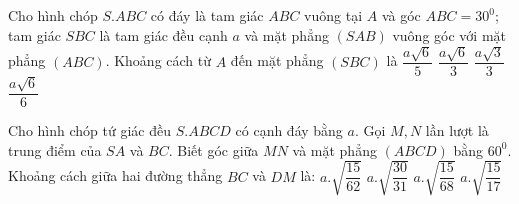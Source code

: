 \begin{ex}%
	Cho hình chóp $S. ABC$ có đáy là tam giác $ABC$ vuông tại $A$ và góc $\widehat{ABC}=30 ^0$; tam giác $SBC$ là tam giác đều cạnh $a$ và mặt phẳng $(SAB)$ vuông góc với mặt phẳng $\left (ABC\right)$. Khoảng cách từ $A$ đến mặt phẳng $\left (SBC\right)$ là
	\choice
	{$\dfrac{a\sqrt{6}}{5}$}
	{$\dfrac{a\sqrt{6}}{3}$}
	{$\dfrac{a\sqrt{3}}{3}$}
	{\True $\dfrac{a\sqrt{6}}{6}$}
\end{ex}
\begin{ex}%
	Cho hình chóp tứ giác đều $S. ABCD$ có cạnh đáy bằng $a$. Gọi $M, N$ lần lượt là trung điểm của $SA$ và $BC$. Biết góc giữa $MN$ và mặt phẳng $\left (ABCD\right)$ bằng $60 ^0$. Khoảng cách giữa hai đường thẳng $BC$ và $DM$ là:
	\choice
	{$a. \sqrt{\dfrac{15}{62}}$}
	{\True $a. \sqrt{\dfrac{30}{31}}$}
	{$a. \sqrt{\dfrac{15}{68}}$}
	{$a. \sqrt{\dfrac{15}{17}}$}
\end{ex}
